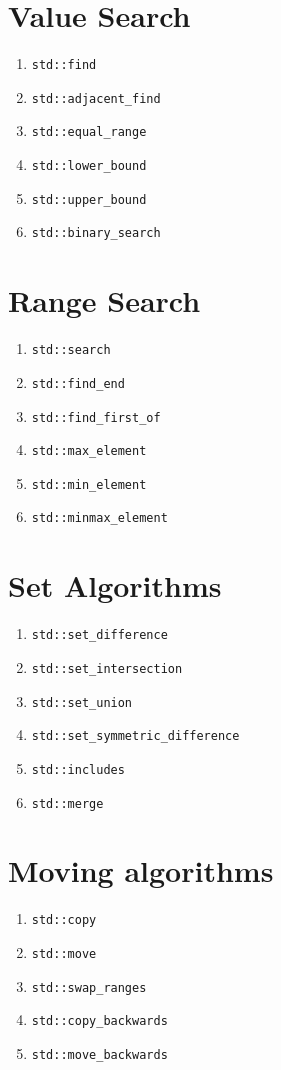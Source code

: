 \documentclass{article}
\begin{document}
\begin{multicols}{3}
\section{Value Search}
\begin{enumerate}[resume]
\setlength\itemsep{0em}
\item \texttt{std::find}
\item \texttt{std::adjacent\_find}
\item \texttt{std::equal\_range}
\item \texttt{std::lower\_bound}
\item \texttt{std::upper\_bound}
\item \texttt{std::binary\_search}
\end{enumerate}

\section{Range Search}
\begin{enumerate}[resume]
\setlength\itemsep{0em}
\item \texttt{std::search}
\item \texttt{std::find\_end}
\item \texttt{std::find\_first\_of}
\item \texttt{std::max\_element}
\item \texttt{std::min\_element}
\item \texttt{std::minmax\_element}
\end{enumerate}

\section{Set Algorithms}
\begin{enumerate}[resume]
\setlength\itemsep{0em}
\item \texttt{std::set\_difference}
\item \texttt{std::set\_intersection}
\item \texttt{std::set\_union}
\item \texttt{std::set\_symmetric\_difference}
\item \texttt{std::includes}
\item \texttt{std::merge}
\end{enumerate}

\section{Moving algorithms}
\begin{enumerate}[resume]
\setlength\itemsep{0em}
\item \texttt{std::copy}
\item \texttt{std::move}
\item \texttt{std::swap\_ranges}
\item \texttt{std::copy\_backwards}
\item \texttt{std::move\_backwards}
\end{enumerate}


\end{multicols}
\end{document}
